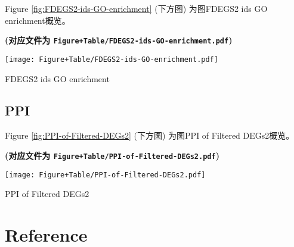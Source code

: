 \documentclass[
]{article}
\begin{document}
Figure \ref{fig:FDEGS2-ids-GO-enrichment} (下方图) 为图FDEGS2 ids GO enrichment概览。

\textbf{(对应文件为 \texttt{Figure+Table/FDEGS2-ids-GO-enrichment.pdf})}

\def\@captype{figure}
\begin{center}
\texttt{[image: Figure+Table/FDEGS2-ids-GO-enrichment.pdf]}
\caption{FDEGS2 ids GO enrichment}\label{fig:FDEGS2-ids-GO-enrichment}
\end{center}

\hypertarget{ppi-1}{%
\subsection{PPI}\label{ppi-1}}

Figure \ref{fig:PPI-of-Filtered-DEGs2} (下方图) 为图PPI of Filtered DEGs2概览。

\textbf{(对应文件为 \texttt{Figure+Table/PPI-of-Filtered-DEGs2.pdf})}

\def\@captype{figure}
\begin{center}
\texttt{[image: Figure+Table/PPI-of-Filtered-DEGs2.pdf]}
\caption{PPI of Filtered DEGs2}\label{fig:PPI-of-Filtered-DEGs2}
\end{center}

\hypertarget{bibliography}{%
\section*{Reference}\label{bibliography}}
\end{document}
